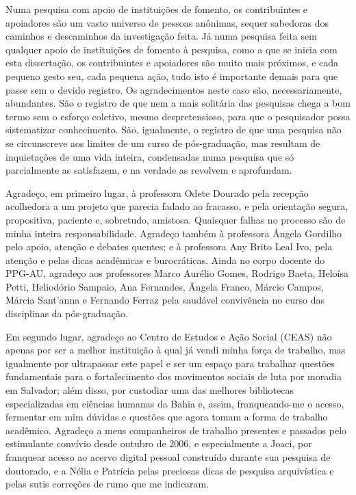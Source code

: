 \begin{agradecimentos}
Numa pesquisa com apoio de instituições de fomento, os contribuintes e apoiadores são um vasto universo de pessoas anônimas, sequer sabedoras dos caminhos e descaminhos da investigação feita. Já numa pesquisa feita sem qualquer apoio de instituições de fomento à pesquisa, como a que se inicia com esta dissertação, os contribuintes e apoiadores são muito mais próximos, e cada pequeno gesto seu, cada pequena ação, tudo isto é importante demais para que passe sem o devido registro. Os agradecimentos neste caso são, necessariamente, abundantes. São o registro de que nem a mais solitária das pesquisas chega a bom termo sem o esforço coletivo, mesmo despretensioso, para que o pesquisador possa sistematizar conhecimento. São, igualmente, o registro de que uma pesquisa não se circunscreve aos limites de um curso de pós-graduação, mas resultam de inquietações de uma vida inteira, condensadas numa pesquisa que só parcialmente as satisfazem, e na verdade as revolvem e aprofundam.

Agradeço, em primeiro lugar, à professora Odete Dourado pela recepção acolhedora a um projeto que parecia fadado ao fracasso, e pela orientação segura, propositiva, paciente e, sobretudo, amistosa. Quaisquer falhas no processo são de minha inteira responsabilidade. Agradeço também à professora Ângela Gordilho pelo apoio, atenção e debates quentes; e à professora Any Brito Leal Ivo, pela atenção e pelas dicas acadêmicas e burocráticas. Ainda no corpo docente do PPG-AU, agradeço aos professores Marco Aurélio Gomes, Rodrigo Baeta, Heloísa Petti, Heliodório Sampaio, Ana Fernandes, Ângela Franco, Márcio Campos, Márcia Sant'anna e Fernando Ferraz pela saudável convivência no curso das disciplinas da pós-graduação.

Em segundo lugar, agradeço ao Centro de Estudos e Ação Social (CEAS) não apenas por ser a melhor instituição à qual já vendi minha força de trabalho, mas igualmente por ultrapassar este papel e ser um espaço para trabalhar questões fundamentais para o fortalecimento dos movimentos sociais de luta por moradia em Salvador; além disso, por custodiar uma das melhores bibliotecas especializadas em ciências humanas da Bahia e, assim, franqueando-me o acesso, fermentar em mim dúvidas e questões que agora tomam a forma de trabalho acadêmico. Agradeço a meus companheiros de trabalho presentes e passados pelo estimulante convívio desde outubro de 2006, e especialmente a Joaci, por franquear acesso ao acervo digital pessoal construído durante sua pesquisa de doutorado, e a Nélia e Patrícia pelas preciosas dicas de pesquisa arquivística e pelas sutis correções de rumo que me indicaram.


\end{agradecimentos}
